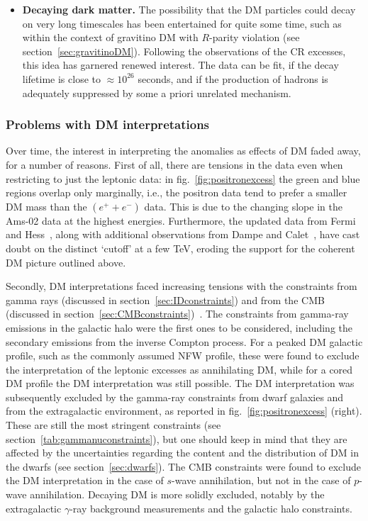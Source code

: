 \begin{itemize}
\item[$\diamond$] {\bf Decaying dark matter.} The possibility that the DM particles could decay on very long timescales has been entertained for quite some time, such as within the context of gravitino DM with $R$-parity violation (see section~\ref{sec:gravitinoDM}). Following the observations of the CR excesses, this idea has garnered renewed interest. The data can be fit, if the decay lifetime is close to $\approx 10^{26}$ seconds, and if the production of hadrons is adequately suppressed by some a priori unrelated mechanism.
\end{itemize} 





\subsubsection*{Problems with DM interpretations}
Over time, the interest in interpreting the anomalies as effects of DM faded away, for a number of reasons. 
First of all, there are tensions in the data even when restricting to just the leptonic data: in fig.~\ref{fig:positronexcess} the green and blue regions overlap only marginally, i.e., the positron data tend to prefer a smaller DM mass  than the $(e^+ + e^-)$ data. 
This is due to the changing slope in the {\sc Ams-02} data at the highest energies. 
Furthermore, the updated data from {\sc Fermi}~\cite{Abdollahi:2017nat} and {\sc Hess}~\cite{HESSleptons2017prelim}, along with additional observations from {\sc Dampe} and {\sc Calet}~\cite{DAMPEexcess}, have cast doubt on the distinct `cutoff' at a few TeV, eroding the support for the coherent DM picture outlined above.




Secondly, DM interpretations faced increasing tensions with the constraints from gamma rays (discussed in section~\ref{sec:IDconstraints}) and from the CMB (discussed in section~\ref{sec:CMBconstraints})~\cite{positronexcessbounds}. 
The constraints   from gamma-ray emissions in the galactic halo were the first ones to be considered, including the secondary emissions from the inverse Compton process.  For a peaked DM galactic profile, such as the commonly assumed NFW profile, these were found to exclude the interpretation of the leptonic excesses as annihilating DM, while for a cored DM profile the DM interpretation was still possible. The DM interpretation was subsequently excluded by the gamma-ray constraints from dwarf galaxies and from the extragalactic environment, as reported in fig.~\ref{fig:positronexcess} (right). These are still the most stringent constraints (see section~\ref{tab:gammanuconstraints}), but one should keep in mind that they are affected by the uncertainties regarding the content and the distribution of DM in the dwarfs (see section~\ref{sec:dwarfs}).
The CMB constraints were found to exclude the DM interpretation in the case of $s$-wave annihilation, but not in the case of $p$-wave annihilation.
Decaying DM is more solidly excluded, notably by the extragalactic $\gamma$-ray background measurements and the galactic halo constraints. 




